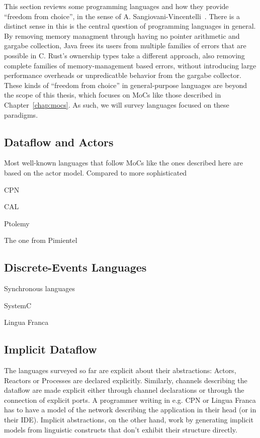 This section reviews some programming languages and how they provide ``freedom from choice'', in the sense of A. Sangiovani-Vincentelli~\cite{lee2019freedom}.
There is a distinct sense in this is the central question of programming languages in general.
By removing memory managment through having no pointer arithmetic and gargabe collection, Java frees its users from multiple families of errors that are possible in C.
Rust's ownership types take a different approach, also removing complete families of memory-management based errors, without introducing large performance overheads or unpredicatble behavior from the gargabe collector.
These kinds of ``freedom from choice'' in general-purpose languages are beyond the scope of this thesis, which focuses on \acp{MoC} like those described in Chapter~\ref{chap:mocs}.
As such, we will survey languages focused on these paradigms.

\subsection{Dataflow and Actors}
Most well-known languages that follow \acp{MoC} like the ones described here are based on the actor model.
Compared to more sophisticated

CPN

CAL

Ptolemy

The one from Pimientel

\subsection{Discrete-Events Languages}

Synchronous languages

SystemC

Lingua Franca


\subsection{Implicit Dataflow}

The languages surveyed so far are explicit about their abstractions: Actors, Reactors or Processes are declared explicitly.
Similarly, channels describing the dataflow are made explicit either through channel declarations or through the connection of explicit ports.
A programmer writing in e.g. \ac{CPN} or Lingua Franca has to have a model of the network describing the application in their head (or in their \acs{IDE}).
Implicit abstractions, on the other hand, work by generating implicit models from linguistic constructs that don't exhibit their structure directly.

